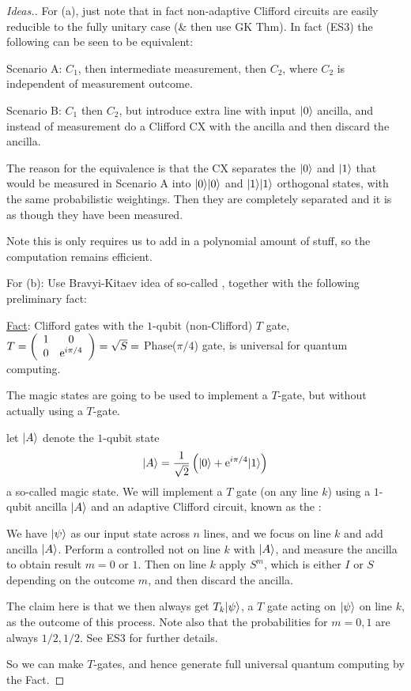 \documentclass[]{article}
\begin{document}
\begin{proof}
	[Ideas.] For (a), just note that in fact non-adaptive Clifford circuits are easily reducible to the fully unitary case (\& then use GK Thm). In fact (ES3) the following can be seen to be equivalent:

	Scenario A: $C_1$, then intermediate measurement, then $C_2$, where $C_2$ is independent of measurement outcome.

	Scenario B: $C_1$ then $C_2$, but introduce extra line with input $\lvert0\rangle$ ancilla, and instead of measurement do a Clifford CX with the ancilla and then discard the ancilla.
	
	The reason for the equivalence is that the CX separates the $\lvert0\rangle$ and $\lvert1\rangle$ that would be measured in Scenario A into $\lvert0\rangle\lvert0\rangle$ and $\lvert1\rangle\lvert1\rangle$ orthogonal states, with the same probabilistic weightings. Then they are completely separated and it is as though they have been measured.

	Note this is only requires us to add in a polynomial amount of stuff, so the computation remains efficient.

	For (b): Use Bravyi-Kitaev idea of so-called , together with the following preliminary fact:

	\underline{Fact}: Clifford gates with the $1$-qubit (non-Clifford) $T$ gate, $T = \left(\begin{array}{cc}1 & 0\\0 & \mathrm{e}^{i\pi/4}\end{array}\right) = \sqrt{S} = $ Phase($\pi/4$) gate, is universal for quantum computing.

	The magic states are going to be used to implement a $T$-gate, but without actually using a $T$-gate.

	let $\lvert A\rangle$ denote the $1$-qubit state $$\lvert A\rangle = \frac{1}{\sqrt{2}}\left(\lvert0\rangle + \mathrm{e}^{i\pi/4}\lvert1\rangle\right)$$ a so-called magic state. We will implement a $T$ gate (on any line $k$) using a $1$-qubit ancilla $\lvert A\rangle$ and an adaptive Clifford circuit, known as the :

	We have $\lvert\psi\rangle$ as our input state across $n$ lines, and we focus on line $k$ and add ancilla $\lvert A\rangle$. Perform a controlled not on line $k$ with $\lvert A\rangle$, and measure the ancilla to obtain result $m = 0$ or $1$. Then on line $k$ apply $S^m$, which is either $I$ or $S$ depending on the outcome $m$, and then discard the ancilla.

	The claim here is that we then always get $T_k\lvert\psi\rangle$, a $T$ gate acting on $\lvert\psi\rangle$ on line $k$, as the outcome of this process. Note also that the probabilities for $m =0,1$ are always $1/2,1/2$. See ES3 for further details.

	So we can make $T$-gates, and hence generate full universal quantum computing by the Fact.
\end{proof}
\end{document}
